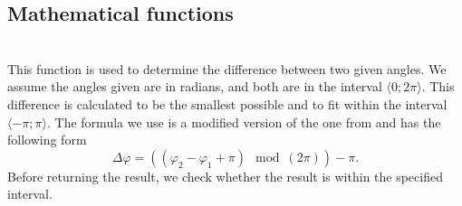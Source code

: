     \subsection{Mathematical functions}
    \label{sec:math_func}
        \\
            This function is used to determine the difference between two given angles. We assume the angles given are in radians, and both are in the interval $\langle0;2\pi\rangle$. This difference is calculated to be the smallest possible and to fit within the interval $\langle-\pi;\pi\rangle$. The formula we use is a modified version of the one from \cite{calc_rotation} and has the following form
            \begin{equation}
                \Delta\varphi = \left((\varphi_{2} - \varphi_{1} + \pi) \mod (2\pi)\right) - \pi.
            \end{equation}
            Before returning the result, we check whether the result is within the specified interval.


